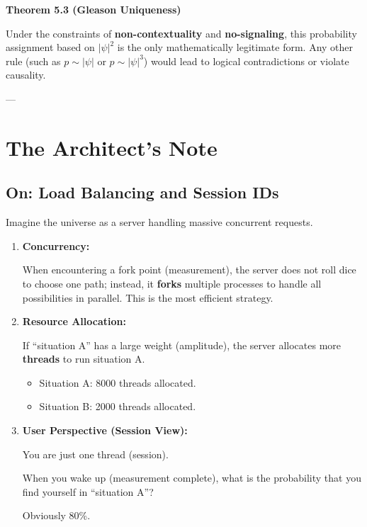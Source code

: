 \documentclass[11pt,a4paper,twoside]{book}
\begin{document}
\textbf{Theorem 5.3 (Gleason Uniqueness)}

Under the constraints of \textbf{non-contextuality} and \textbf{no-signaling}, this probability assignment based on \textbf{$|\psi|^2$} is the only mathematically legitimate form. Any other rule (such as \textbf{$p \sim |\psi|$} or \textbf{$p \sim |\psi|^3$}) would lead to logical contradictions or violate causality.

---

\section{The Architect's Note}

\subsection{On: Load Balancing and Session IDs}

Imagine the universe as a server handling massive concurrent requests.

\begin{enumerate}
\item \textbf{Concurrency:}

    When encountering a fork point (measurement), the server does not roll dice to choose one path; instead, it \textbf{forks} multiple processes to handle all possibilities in parallel. This is the most efficient strategy.

\item \textbf{Resource Allocation:}

    If ``situation A'' has a large weight (amplitude), the server allocates more \textbf{threads} to run situation A.

    \begin{itemize}
    \item Situation A: 8000 threads allocated.

    \item Situation B: 2000 threads allocated.
    \end{itemize}

\item \textbf{User Perspective (Session View):}

    You are just one thread (session).

    When you wake up (measurement complete), what is the probability that you find yourself in ``situation A''?

    Obviously 80\%.
\end{enumerate}
\end{document}
